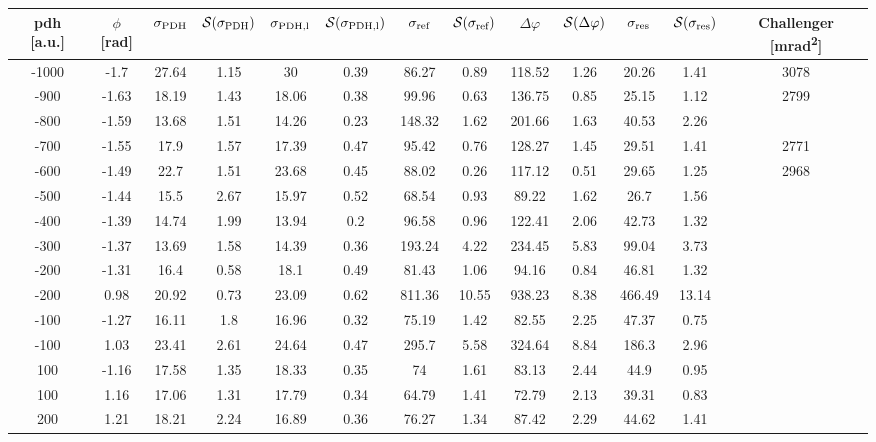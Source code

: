 \begin{landscape}
	
	\begin{table}
	\centering
	\begin{tabular}{|c|c|c|c|c|c|c|c|c|c|c|c|c|}
		\hline
		\gls{pdh} [a.u.] & $\phi$ [\si{\radian}] & $\sigma_{\text{PDH}}$ & $\mathcal{S}(\sigma_{\text{PDH}})$ & $\sigma_{\text{PDH,l}}$ & $\mathcal{S}(\sigma_{\text{PDH,l}})$  & $\sigma_{\text{ref}}$ & $\mathcal{S}(\sigma_{\text{ref}})$ & $\Delta \varphi$ & $\mathcal{S}(\Delta \varphi)$ & $\sigma_{\text{res}}$  & $\mathcal{S}(\sigma_{\text{res}})$ & Challenger [\si{\milli\radian\squared}] \\
		\hline
		\hline
		-1000 & -1.7 & 27.64 & 1.15 & 30 & 0.39 & 86.27 & 0.89 & 118.52 & 1.26 & 20.26 & 1.41 & 3078\\
		-900 & -1.63 & 18.19 & 1.43 & 18.06 & 0.38 & 99.96 & 0.63 & 136.75 & 0.85 & 25.15 & 1.12 & 2799\\
		-800 & -1.59 & 13.68 & 1.51 & 14.26 & 0.23 & 148.32 & 1.62 & 201.66 & 1.63 & 40.53 & 2.26 & \\
		-700 & -1.55 & 17.9 & 1.57 & 17.39 & 0.47 & 95.42 & 0.76 & 128.27 & 1.45 & 29.51 & 1.41 & 2771\\
		-600 & -1.49 & 22.7 & 1.51 & 23.68 & 0.45 & 88.02 & 0.26 & 117.12 & 0.51 & 29.65 & 1.25 & 2968\\
		-500 & -1.44 & 15.5 & 2.67 & 15.97 & 0.52 & 68.54 & 0.93 & 89.22 & 1.62 & 26.7 & 1.56 & \\
		-400 & -1.39 & 14.74 & 1.99 & 13.94 & 0.2 & 96.58 & 0.96 & 122.41 & 2.06 & 42.73 & 1.32 & \\
		-300 & -1.37 & 13.69 & 1.58 & 14.39 & 0.36 & 193.24 & 4.22 & 234.45 & 5.83 & 99.04 & 3.73 & \\
		-200 & -1.31 & 16.4 & 0.58 & 18.1 & 0.49 & 81.43 & 1.06 & 94.16 & 0.84 & 46.81 & 1.32 & \\
		-200 & 0.98 & 20.92 & 0.73 & 23.09 & 0.62 & 811.36 & 10.55 & 938.23 & 8.38 & 466.49 & 13.14 & \\
		-100 & -1.27 & 16.11 & 1.8 & 16.96 & 0.32 & 75.19 & 1.42 & 82.55 & 2.25 & 47.37 & 0.75 & \\
		-100 & 1.03 & 23.41 & 2.61 & 24.64 & 0.47 & 295.7 & 5.58 & 324.64 & 8.84 & 186.3 & 2.96 & \\
		100 & -1.16 & 17.58 & 1.35 & 18.33 & 0.35 & 74 & 1.61 & 83.13 & 2.44 & 44.9 & 0.95 & \\
		100 & 1.16 & 17.06 & 1.31 & 17.79 & 0.34 & 64.79 & 1.41 & 72.79 & 2.13 & 39.31 & 0.83 & \\
		200 & 1.21 & 18.21 & 2.24 & 16.89 & 0.36 & 76.27 & 1.34 & 87.42 & 2.29 & 44.62 & 1.41 & \\

\end{tabular}
\end{table}
\end{landscape}
